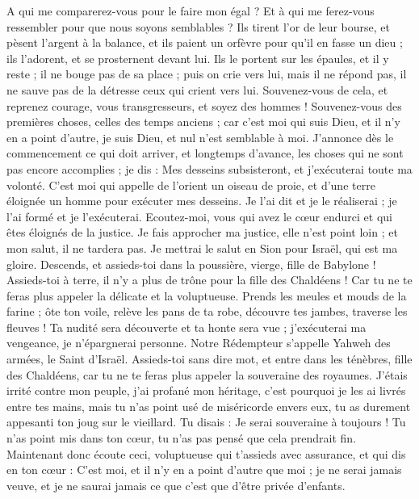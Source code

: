 \begin{multicols}{2}
A qui me comparerez-vous pour le faire mon égal ? Et à qui me ferez-vous ressembler pour que nous soyons semblables ?
Ils tirent l'or de leur bourse, et pèsent l'argent à la balance, et ils paient un orfèvre pour qu'il en fasse un dieu ; ils l'adorent, et se prosternent devant lui.
Ils le portent sur les épaules, et il y reste ; il ne bouge pas de sa place ; puis on crie vers lui, mais il ne répond pas, il ne sauve pas de la détresse ceux qui crient vers lui.
Souvenez-vous de cela, et reprenez courage, vous transgresseurs, et soyez des hommes !
Souvenez-vous des premières choses, celles des temps anciens ; car c'est moi qui suis Dieu, et il n'y en a point d'autre, je suis Dieu, et nul n'est semblable à moi.
J'annonce dès le commencement ce qui doit arriver, et longtemps d'avance, les choses qui ne sont pas encore accomplies ; je dis : Mes desseins subsisteront, et j'exécuterai toute ma volonté.
C'est moi qui appelle de l'orient un oiseau de proie, et d'une terre éloignée un homme pour exécuter mes desseins. Je l'ai dit et je le réaliserai ; je l'ai formé et je l'exécuterai.
Ecoutez-moi, vous qui avez le cœur endurci et qui êtes éloignés de la justice.
Je fais approcher ma justice, elle n'est point loin ; et mon salut, il ne tardera pas. Je mettrai le salut en Sion pour Israël, qui est ma gloire.
\VerseOne{}Descends, et assieds-toi dans la poussière, vierge, fille de Babylone ! Assieds-toi à terre, il n'y a plus de trône pour la fille des Chaldéens ! Car tu ne te feras plus appeler la délicate et la voluptueuse.
Prends les meules et mouds de la farine ; ôte ton voile, relève les pans de ta robe, découvre tes jambes, traverse les fleuves !
Ta nudité sera découverte et ta honte sera vue ; j'exécuterai ma vengeance, je n'épargnerai personne.
Notre Rédempteur s'appelle Yahweh des armées, le Saint d'Israël.
Assieds-toi sans dire mot, et entre dans les ténèbres, fille des Chaldéens, car tu ne te feras plus appeler la souveraine des royaumes.
J'étais irrité contre mon peuple, j'ai profané mon héritage, c'est pourquoi je les ai livrés entre tes mains, mais tu n'as point usé de miséricorde envers eux, tu as durement appesanti ton joug sur le vieillard.
Tu disais : Je serai souveraine à toujours ! Tu n'as point mis dans ton cœur, tu n'as pas pensé que cela prendrait fin.
Maintenant donc écoute ceci, voluptueuse qui t'assieds avec assurance, et qui dis en ton cœur : C'est moi, et il n'y en a point d'autre que moi ; je ne serai jamais veuve, et je ne saurai jamais ce que c'est que d'être privée d'enfants.

\end{multicols}
